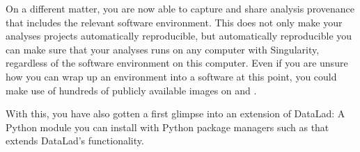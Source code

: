 \sphinxAtStartPar
On a different matter, you are now able to capture and share analysis provenance that
includes the relevant software environment. This does not only make your analyses
projects automatically reproducible, but automatically  reproducible \sphinxhyphen{}
you can make sure that your analyses runs on any computer with Singularity,
regardless of the software environment on this computer. Even if you are unsure how you can wrap up an
environment into a software {\hyperref[\detokenize{glossary:term-container-image}]{}} at this point, you could make use of
hundreds of publicly available images on  and
.

\sphinxAtStartPar
With this, you have also gotten a first glimpse into an extension of DataLad: A
Python module you can install with Python package managers such as  that
extends DataLad’s functionality.

\sphinxstepscope


